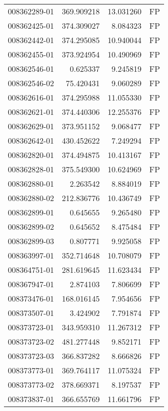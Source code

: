 \begin{tabular}{lrrl}
008362289-01 &  369.909218 &      13.031260 &   FP \\
008362425-01 &  374.309027 &       8.084323 &   FP \\
008362442-01 &  374.295085 &      10.940044 &   FP \\
008362455-01 &  373.924954 &      10.490969 &   FP \\
008362546-01 &    0.625337 &       9.245819 &   FP \\
008362546-02 &   75.420431 &       9.060289 &   FP \\
008362616-01 &  374.295988 &      11.055330 &   FP \\
008362621-01 &  374.440306 &      12.255376 &   FP \\
008362629-01 &  373.951152 &       9.068477 &   FP \\
008362642-01 &  430.452622 &       7.249294 &   FP \\
008362820-01 &  374.494875 &      10.413167 &   FP \\
008362828-01 &  375.549300 &      10.624969 &   FP \\
008362880-01 &    2.263542 &       8.884019 &   FP \\
008362880-02 &  212.836776 &      10.436749 &   FP \\
008362899-01 &    0.645655 &       9.265480 &   FP \\
008362899-02 &    0.645652 &       8.475484 &   FP \\
008362899-03 &    0.807771 &       9.925058 &   FP \\
008363997-01 &  352.714648 &      10.708079 &   FP \\
008364751-01 &  281.619645 &      11.623434 &   FP \\
008367947-01 &    2.874103 &       7.806699 &   FP \\
008373476-01 &  168.016145 &       7.954656 &   FP \\
008373507-01 &    3.424902 &       7.791874 &   FP \\
008373723-01 &  343.959310 &      11.267312 &   FP \\
008373723-02 &  481.277448 &       9.852171 &   FP \\
008373723-03 &  366.837282 &       8.666826 &   FP \\
008373773-01 &  369.764117 &      11.075324 &   FP \\
008373773-02 &  378.669371 &       8.197537 &   FP \\
008373837-01 &  366.655769 &      11.661796 &   FP \\

\end{tabular}
